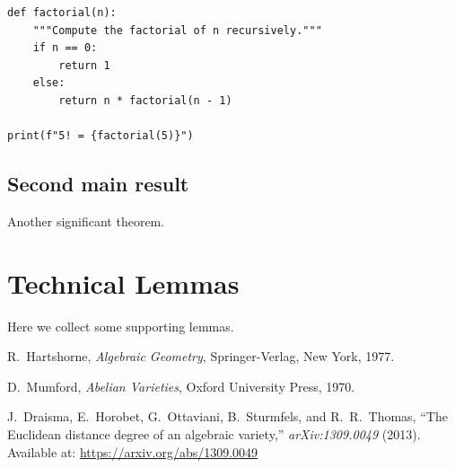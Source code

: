 \documentclass[12pt,reqno,oneside]{amsbook}
\theoremstyle{definition}
\begin{document}
\begin{lstlisting}[basicstyle = \ttfamily\small,resetmargins=true,tabsize=5,extendedchars=false]
def factorial(n):
    """Compute the factorial of n recursively."""
    if n == 0:
        return 1
    else:
        return n * factorial(n - 1)

print(f"5! = {factorial(5)}")
\end{lstlisting}



\section{Second main result}
Another significant theorem.

\appendix
\chapter{Technical Lemmas}
Here we collect some supporting lemmas.

\begin{thebibliography}{9}


R.~Hartshorne, \emph{Algebraic Geometry}, Springer-Verlag, New York, 1977.

D.~Mumford, \emph{Abelian Varieties}, Oxford University Press, 1970.

J.~Draisma, E.~Horobet, G.~Ottaviani, B.~Sturmfels, and R.~R.~Thomas, 
``The Euclidean distance degree of an algebraic variety,'' 
\emph{arXiv:1309.0049} (2013).  
Available at: \href{https://arxiv.org/abs/1309.0049}{https://arxiv.org/abs/1309.0049}

\end{thebibliography}
\end{document}
